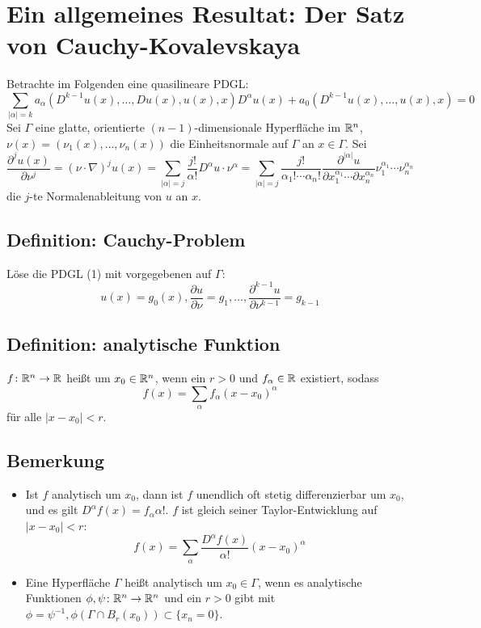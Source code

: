 \section{Ein allgemeines Resultat: Der Satz von Cauchy-Kovalevskaya}
\label{sec:para2}

Betrachte im Folgenden eine quasilineare PDGL:
\begin{equation} \sum\limits_{|\alpha|=k} a_{\alpha}(D^{k-1} u(x), \dots , Du(x),u(x),x) D^\alpha u(x) + a_0(D^{k-1} u(x),\dots,u(x),x) = 0 \end{equation}
Sei $\Gamma$ eine glatte, orientierte $(n-1)$-dimensionale Hyperfläche im $\mathbb{R}^n$, $\nu(x) = (\nu_1(x), \dots, \nu_n(x))$ die Einheitsnormale auf $\Gamma$ an $x \in \Gamma$. Sei 
\[\frac{\partial^j u(x)}{\partial \nu^j} = (\nu \cdot \nabla)^j u(x) = \sum\limits_{|\alpha|=j} \frac{j!}{\alpha!} D^\alpha u \cdot \nu^\alpha = \sum\limits_{|\alpha|=j} \frac{j!}{\alpha_1!\cdots\alpha_n!} \frac{\partial^{|\alpha|}u}{\partial x_1^{\alpha_1} \cdots \partial x_n^{\alpha_n}} \nu_1^{\alpha_1} \cdots \nu_n^{\alpha_n}\] die $j$-te Normalenableitung von $u$ an $x$.

\subsection{Definition: Cauchy-Problem}
\label{def_cauchy_problem}
	Löse die PDGL (1) mit vorgegebenen  auf $\Gamma$:  
	\begin{equation}
		u(x) = g_0(x), \frac{\partial u}{\partial \nu} = g_1, \dots, \frac{\partial^{k-1} u}{\partial \nu^{k-1}} = g_{k-1} \end{equation}

\subsection{Definition: analytische Funktion}
\label{def_analytische_fkt}
	$f\colon \mathbb{R}^n \rightarrow \mathbb{R}$ heißt  um $x_0 \in \mathbb{R}^n$, wenn ein $r > 0$ und $f_\alpha \in \mathbb{R}$ existiert, sodass
	\[ f(x) = \sum_{\alpha} f_\alpha (x-x_0)^\alpha \]
	für alle $|x-x_0| < r$.
	
\subsection{Bemerkung}
	\begin{itemize}
		\item Ist $f$ analytisch um $x_0$, dann ist $f$ unendlich oft stetig differenzierbar um $x_0$, und es gilt $D^\alpha f(x) = f_\alpha \alpha!$. $f$ ist gleich seiner Taylor-Entwicklung auf $|x-x_0| < r$:
		\[ f(x) = \sum_{\alpha} \frac{D^\alpha f(x)}{\alpha!} (x-x_0)^\alpha \]
		\item Eine Hyperfläche $\Gamma$ heißt analytisch um $x_0 \in \Gamma$, wenn es analytische Funktionen $\phi, \psi\colon \mathbb{R}^n \rightarrow \mathbb{R}^n$ und ein $r > 0$ gibt mit $\phi = \psi^{-1}, \phi(\Gamma \cap B_r(x_0)) \subset \{x_n = 0\}$.
	\end{itemize}
	
